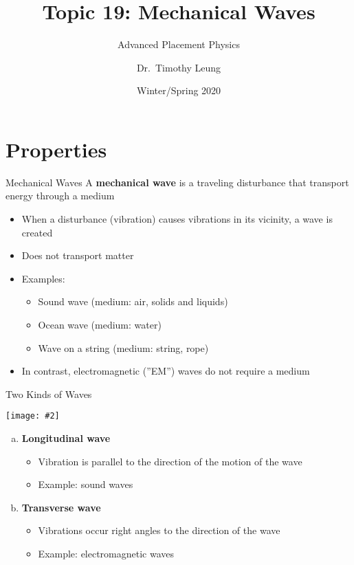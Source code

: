 \documentclass[12pt,aspectratio=169]{beamer}
\title[Waves]{Topic 19: Mechanical Waves}
\subtitle{Advanced Placement Physics}
\author[TML]{Dr.\ Timothy Leung}
\institute{Olympiads School\\Toronto, Ontario, Canada}
\date{Winter/Spring 2020}
\newcommand{\pic}[2]{\texttt{[image: \#2]}}
\begin{document}
\begin{frame}
  \titlepage
\end{frame}



\section{Properties}

\begin{frame}{Mechanical Waves}
  A \textbf{mechanical wave} is a traveling disturbance that transport energy
  through a medium
  \begin{itemize}
  \item When a disturbance (vibration) causes vibrations in its vicinity, a
    wave is created
  \item Does not transport matter
  \item Examples:
    \begin{itemize}
    \item Sound wave (medium: air, solids and liquids)
    \item Ocean wave (medium: water)
    \item Wave on a string (medium: string, rope)
    \end{itemize}
  \item In contrast, electromagnetic (''EM'') waves do not require a medium
  \end{itemize}
\end{frame}




\begin{frame}{Two Kinds of Waves}
  \begin{center}
    \pic{.6}{main-qimg.png}
  \end{center}
  \begin{enumerate}[a.]
  \item\textbf{Longitudinal wave}
    \begin{itemize}
    \item Vibration is parallel to the direction of the motion of the wave
    \item Example: sound waves
    \end{itemize}
  \item\textbf{Transverse wave}
    \begin{itemize}
    \item Vibrations occur right angles to the direction of the wave
    \item Example: electromagnetic waves
    \end{itemize}
  \end{enumerate}
\end{frame}
\end{document}
